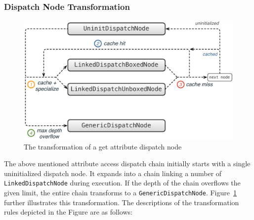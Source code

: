 \subsubsection{Dispatch Node Transformation}

\begin{figure}
\centering
\includegraphics[scale=.65]{figures/ch5-attribute-dispatch-transformation}
\caption{The transformation of a get attribute dispatch node}
\label{fig:ch5-attribute-dispatch-transformation}
\end{figure}

The above mentioned attribute access dispatch chain initially starts with a single uninitialized dispatch node.
It expands into a chain linking a number of \texttt{LinkedDispatchNode} during execution.
If the depth of the chain overflows the given limit, the entire chain transforms to a \texttt{GenericDispatchNode}.
Figure~\ref{fig:ch5-attribute-dispatch-transformation} further illustrates this transformation.
The descriptions of the transformation rules depicted in the Figure are as follows:

